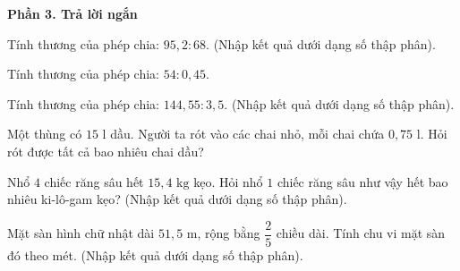 \textbf{Phần 3. Trả lời ngắn}

\begin{ex} %
Tính thương của phép chia: $95{,}2 : 68$. (Nhập kết quả dưới dạng số thập phân).
\end{ex}

\begin{ex} %
Tính thương của phép chia: $54 : 0{,}45$.
\end{ex}

\begin{ex} %
Tính thương của phép chia: $144{,}55 : 3{,}5$. (Nhập kết quả dưới dạng số thập phân).
\end{ex}

\begin{ex} %
Một thùng có $15\text{ l}$ dầu. Người ta rót vào các chai nhỏ, mỗi chai chứa $0{,}75\text{ l}$. Hỏi rót được tất cả bao nhiêu chai dầu?
\end{ex}

\begin{ex} %
Nhổ $4$ chiếc răng sâu hết $15{,}4\text{ kg}$ kẹo. Hỏi nhổ $1$ chiếc răng sâu như vậy hết bao nhiêu ki-lô-gam kẹo? (Nhập kết quả dưới dạng số thập phân).
\end{ex}

\begin{ex} %
Mặt sàn hình chữ nhật dài $51{,}5\text{ m}$, rộng bằng $\dfrac{2}{5}$ chiều dài. Tính chu vi mặt sàn đó theo mét. (Nhập kết quả dưới dạng số thập phân).
\end{ex}
